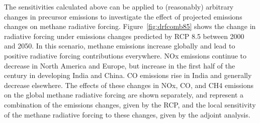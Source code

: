 The sensitivities calculated above can be applied to (reasonably) arbitrary changes in precursor emissions to investigate the effect of projected emissions changes on methane radiative forcing. Figure~\ref{fig:drfcomb85} shows the change in radiative forcing under emissions changes predicted by RCP 8.5 between 2000 and 2050. In this scenario, methane emissions increase globally and lead to positive radiative forcing contributions everywhere. NOx emissions continue to decrease in North America and Europe, but increase in the first half of the century in developing India and China. CO emissions rise in India and generally decrease elsewhere. The effects of these changes in NOx, CO, and CH4 emissions on the global methane radiative forcing are shown separately, and represent a combination of the emissions changes, given by the RCP, and the local sensitivity of the methane radiative forcing to these changes, given by the adjoint analysis.